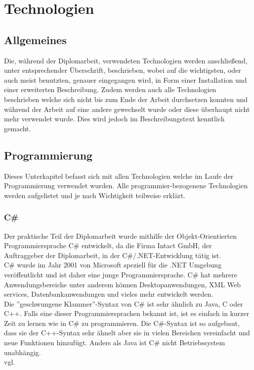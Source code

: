 \renewcommand{\theauthor}{Dario Wagner}
\chapter{Technologien}
\label{sec:Technologien}
\section{Allgemeines}
\label{sec:TechnologieAllgemeines}
Die, während der Diplomarbeit, verwendeten Technologien werden anschließend, unter entsprechender Überschrift, beschrieben, wobei auf die wichtigsten, oder auch meist benutzten, genauer eingegangen wird, in Form einer Installation und einer erweiterten Beschreibung. Zudem werden auch alle Technologien beschrieben welche sich nicht bis zum Ende der Arbeit durchsetzen konnten und während der Arbeit auf eine andere gewechselt wurde oder diese überhaupt nicht mehr verwendet wurde. Dies wird jedoch im Beschreibungstext kenntlich gemacht.
\section{Programmierung}
\label{sec:TechnologieProgrammierung}
Dieses Unterkapitel befasst sich mit allen Technologien welche im Laufe der Programmierung verwendet wurden. Alle programmier-bezogenene Technologien werden aufgelistet und je nach Wichtigkeit teilweise erklärt.
\subsection{C\#}
\label{sec:CSharp}
Der praktische Teil der Diplomarbeit wurde mithilfe der Objekt-Orientierten Programmiersprache C\# entwickelt, da die Firma Intact GmbH, der Auftraggeber der Diplomarbeit, in der C\#/.NET-Entwicklung tätig ist. \\ \break
C\# wurde im Jahr 2001 von Microsoft speziell für die .NET Umgebung veröffentlicht und ist daher eine junge Programmiersprache. C\# hat mehrere Anwendungsbereiche unter anderem können Desktopanwendungen, XML Web services, Datenbankanwendungen und vieles mehr entwickelt werden. \\ \break
Die ''geschwungene Klammer''-Syntax von C\# ist sehr ähnlich zu Java, C oder C++. Falls eine dieser Programmiersprachen bekannt ist, ist es einfach in kurzer Zeit zu lernen wie in C\# zu programmieren. Die C\#-Syntax ist so aufgebaut, dass sie der C++-Syntax sehr ähnelt aber sie in vielen Bereichen vereinfacht und neue Funktionen hinzufügt. Anders als Java ist C\# nicht Betriebssystem unabhängig. \\vgl. \cite{TechnologieCSharpErklaerung} 
